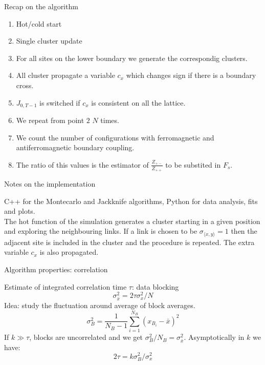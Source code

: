 \documentclass[12pt,handout]{beamer}
\begin{document}
\begin{frame}{Recap on the algorithm}
\begin{center}

\begin{enumerate}
\item Hot/cold start
\item Single cluster update
\item For all sites on the lower boundary we generate the correspondig clusters.
\item All cluster propagate a variable $c_x$ which changes sign if there is a boundary cross.
\item  $J_{0, T-1}$ is switched if $c_x$ is consistent on all the lattice.
\item We repeat from point $2$ $N$ times.
\item We count the number of configurations with ferromagnetic and antiferromagnetic boundary coupling.
\item The ratio of this values is the estimator of $\frac{Z_{+-}}{Z_{++}}$ to be substited in $F_s$.
\end{enumerate}


\end{center}
\end{frame}

\begin{frame}{Notes on the implementation}
\begin{center}

C++ for the Montecarlo and Jackknife algorithms, Python for data analysis, fits and plots.\\
\vspace{20pt}
The hot function of the simulation generates a cluster starting in a given position and exploring the neighbouring links. If a link is chosen to be $\sigma_{\langle x, y \rangle} = 1$ then the adjacent site is included in the cluster and the procedure is repeated. The extra variable $c_x$ is also propagated.
\end{center}
\end{frame}

\begin{frame}{Algorithm properties: correlation}
\begin{center}
Estimate of integrated correlation time $\tau$: data blocking
\[
\sigma_{\bar{x}}^2 = 2\tau\sigma_{x}^2/N
\]
Idea: study the fluctuation around average of block averages.
\[
\sigma _B ^2 = \frac{1}{N_B - 1}\sum_ {i = 1} ^{N_B} \left( x_{B_i} - \bar{x} \right)^2 
\]
If $k\gg\tau$, blocks are uncorrelated and we get $\sigma_B^2/N_B = \sigma_{\bar{x}}^2$.
Asymptotically in $k$ we have:
\[
2\tau = k \sigma_B ^2/\sigma_{x}^2
\]
\end{center}
\end{frame}
\end{document}
